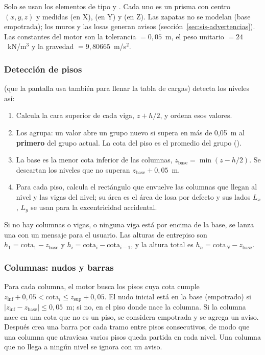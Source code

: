 Solo se usan los elementos de tipo  y . Cada uno es un prisma con centro $(x, y, z)$ y medidas
 (en X),  (en Y) y  (en Z). Las zapatas no se modelan (base empotrada); los muros y
las losas generan avisos (sección~\ref{sec:sis-advertencias}). Las constantes del motor son la tolerancia
 $= 0{,}05$~m, el peso unitario  $= 24$~kN/m$^3$ y la
gravedad  $= 9{,}80665$~m/s$^2$.

\subsubsection{Detección de pisos}

 (que la pantalla usa también para llenar la tabla de cargas) detecta los niveles así:

\begin{enumerate}
	\item Calcula la cara superior de cada viga, $z + h/2$, y ordena esos valores.
	\item Los agrupa: un valor abre un grupo nuevo si supera en más de 0,05~m al \textbf{primero} del grupo actual. La cota
	      del piso es el promedio del grupo ().
	\item La base es la menor cota inferior de las columnas, $z_{\text{base}} = \min(z - h/2)$. Se descartan los niveles
	      que no superan $z_{\text{base}} + 0{,}05$~m.
	\item Para cada piso,  calcula el rectángulo que envuelve las columnas que llegan al
	      nivel y las vigas del nivel; su área es el área de losa por defecto y sus lados $L_x$, $L_y$ se usan para la
	      excentricidad accidental.
\end{enumerate}

Si no hay columnas o vigas, o ninguna viga está por encima de la base, se lanza una  con
un mensaje para el usuario. Las alturas de entrepiso son $h_1 = \text{cota}_1 - z_{\text{base}}$ y
$h_i = \text{cota}_i - \text{cota}_{i-1}$, y la altura total es $h_n = \text{cota}_N - z_{\text{base}}$.

\subsubsection{Columnas: nudos y barras}

Para cada columna, el motor busca los pisos cuya cota cumple
$z_{\text{inf}} + 0{,}05 < \text{cota}_i \le z_{\text{sup}} + 0{,}05$. El nudo inicial está en la base (empotrado) si
$|z_{\text{inf}} - z_{\text{base}}| \le 0{,}05$~m; si no, en el piso donde nace la columna. Si la columna nace en una
cota que no es un piso, se considera empotrada y se agrega un aviso. Después crea una barra por cada tramo entre pisos
consecutivos, de modo que una columna que atraviesa varios pisos queda partida en cada nivel. Una columna que no llega
a ningún nivel se ignora con un aviso.

